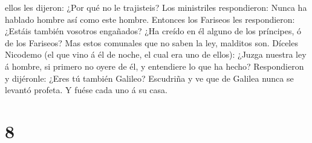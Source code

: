 ellos les dijeron: ¿Por qué no le trajisteis?  Los
ministriles respondieron: Nunca ha hablado hombre así como este hombre.
 Entonces los Fariseos les respondieron: ¿Estáis también
vosotros engañados?  ¿Ha creído en él alguno de los
príncipes, ó de los Fariseos?  Mas estos comunales que no
saben la ley, malditos son.  Díceles Nicodemo (el que vino
á él de noche, el cual era uno de ellos):  ¿Juzga nuestra
ley á hombre, si primero no oyere de él, y entendiere lo que ha hecho?
 Respondieron y dijéronle: ¿Eres tú también Galileo?
Escudriña y ve que de Galilea nunca se levantó profeta.  Y
fuése cada uno á su casa.

\hypertarget{section-7}{%
\section{8}\label{section-7}}

